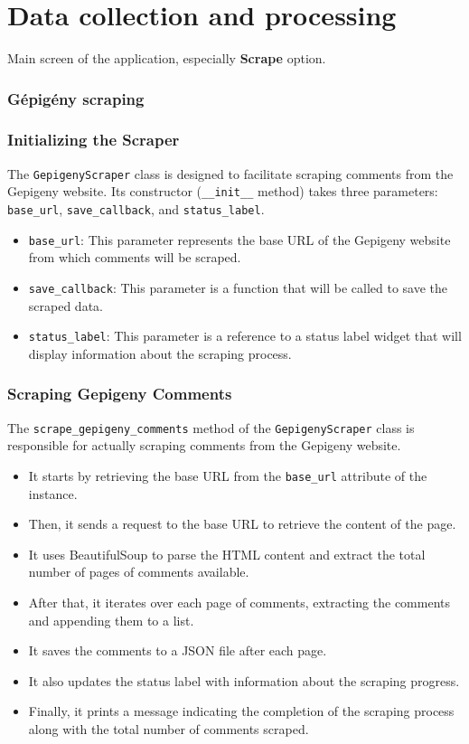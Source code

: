\section{Data collection and processing}
Main screen of the application, especially \textbf{Scrape} option.

\subsubsection*{Gépigény scraping}
\subsubsection*{Initializing the Scraper}
The \texttt{GepigenyScraper} class is designed to facilitate scraping comments from the Gepigeny website. Its constructor (\texttt{\_\_init\_\_} method) takes three parameters: \texttt{base\_url}, \texttt{save\_callback}, and \texttt{status\_label}. 

\begin{itemize}
    \item \texttt{base\_url}: This parameter represents the base URL of the Gepigeny website from which comments will be scraped.
    \item \texttt{save\_callback}: This parameter is a function that will be called to save the scraped data.
    \item \texttt{status\_label}: This parameter is a reference to a status label widget that will display information about the scraping process.
\end{itemize}

\subsubsection*{Scraping Gepigeny Comments}
The \texttt{scrape\_gepigeny\_comments} method of the \texttt{GepigenyScraper} class is responsible for actually scraping comments from the Gepigeny website.

\begin{itemize}
    \item It starts by retrieving the base URL from the \texttt{base\_url} attribute of the instance.
    \item Then, it sends a request to the base URL to retrieve the content of the page.
    \item It uses BeautifulSoup to parse the HTML content and extract the total number of pages of comments available.
    \item After that, it iterates over each page of comments, extracting the comments and appending them to a list.
    \item It saves the comments to a JSON file after each page.
    \item It also updates the status label with information about the scraping progress.
    \item Finally, it prints a message indicating the completion of the scraping process along with the total number of comments scraped.
\end{itemize}

